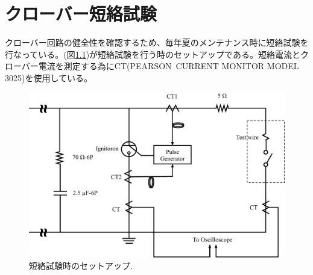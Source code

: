 \documentclass[book,openany]{jlreq}
\theoremstyle{definition}
\begin{document}
\chapter{クローバー短絡試験}
クローバー回路の健全性を確認するため、毎年夏のメンテナンス時に短絡試験を行なっている。(図\ref{fig:CrowbarTest})が短絡試験を行う時のセットアップである。短絡電流とクローバー電流を測定する為にCT(PEARSON\texttrademark\, CURRENT MONITOR MODEL 3025)を使用している。
%
\begin{figure}[htbp]
  \begin{center}
    \includegraphics[width=12cm]{figs/Crowbar_Test.pdf}
    \caption{短絡試験時のセットアップ.}
    \label{fig:CrowbarTest}
  \end{center}
\end{figure}
\end{document}

